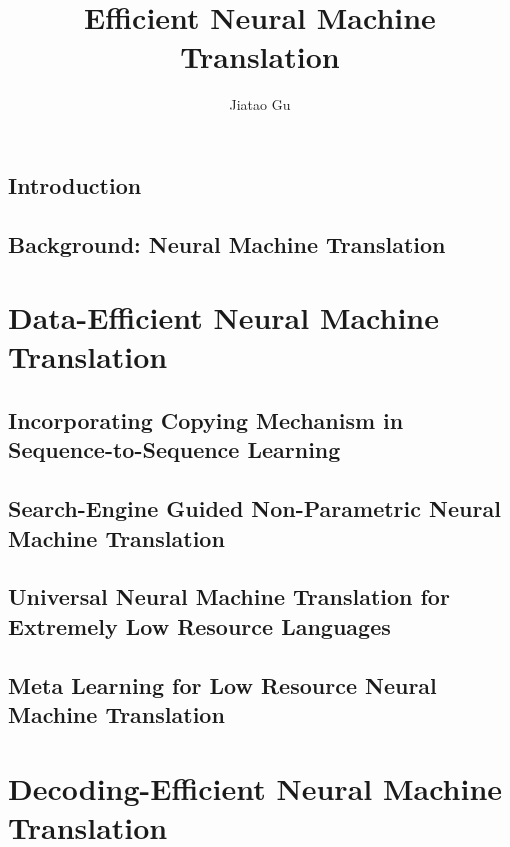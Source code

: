 \documentclass[12pt]{report}
\begin{document}
\title{Efficient Neural Machine Translation}
\author{Jiatao Gu}

\beforepreface


\afterpreface

\chapter{Introduction}
\label{intro}


\chapter[Background]{Background: Neural Machine Translation}
\label{background}


\part{Data-Efficient Neural Machine Translation}
\chapter[Copying Mechanism]{Incorporating Copying Mechanism in Sequence-to-Sequence Learning}
\label{copy}


\chapter[Non-Parametric Neural Machine Translation]{Search-Engine Guided Non-Parametric Neural Machine Translation}
\label{seg-nmt}


\chapter[Universal Neural Machine Translation]{Universal Neural Machine Translation for Extremely Low Resource Languages}
\label{ulr}


\chapter[Meta Learning for Neural Machine Translation]{Meta Learning for Low Resource Neural Machine Translation}
\label{MetaNMT}


\part{Decoding-Efficient Neural Machine Translation}
\end{document}
